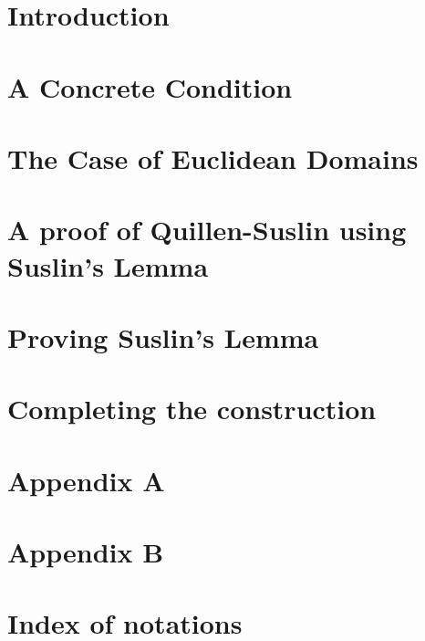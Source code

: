 \documentclass[12pt]{article}
\begin{document}

\section{Introduction}
\label{sec:introduction}


\section{A Concrete Condition}
\label{sec:concrete_condition}


\section{The Case of Euclidean Domains}
\label{sec:euclideancase}


\section{A proof of Quillen-Suslin using Suslin's Lemma}
\label{sec:quillen_suslin_proof}


\section{Proving Suslin's Lemma}
\label{sec:suslins_lemma}


\section{Completing the construction}
\label{sec:lemma611_constructive_proof}


\section{Appendix A}
\label{sec:appendix_code}


\section{Appendix B}
\label{sec:appendix_tests}


\section{Index of notations}
\label{sec:notation}


% 



\end{document}
